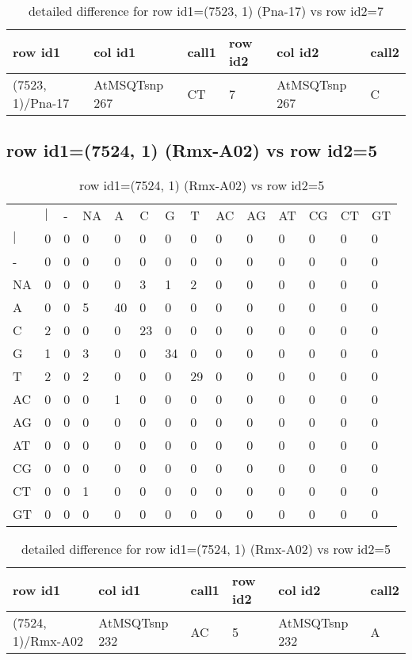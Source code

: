 \begin{center}
\begin{longtable}{|l|l|l|l|l|l|}
\caption{detailed difference for row id1=(7523, 1) (Pna-17) vs row id2=7} \label{table_dm337}\\
\hline
row id1&col id1&call1&row id2&col id2&call2\\
\hline
(7523, 1)/Pna-17&AtMSQTsnp 267&CT&7&AtMSQTsnp 267&C\\
\hline
\end{longtable}
\end{center}

\subsection{row id1=(7524, 1) (Rmx-A02) vs row id2=5}
\begin{center}
\begin{longtable}{|l|l|l|l|l|l|l|l|l|l|l|l|l|l|}
\caption{row id1=(7524, 1) (Rmx-A02) vs row id2=5} \label{table_dm338}\\
\hline
\\
\hline
&$|$&-&NA&A&C&G&T&AC&AG&AT&CG&CT&GT\\
$|$&0&0&0&0&0&0&0&0&0&0&0&0&0\\
-&0&0&0&0&0&0&0&0&0&0&0&0&0\\
NA&0&0&0&0&3&1&2&0&0&0&0&0&0\\
A&0&0&5&40&0&0&0&0&0&0&0&0&0\\
C&2&0&0&0&23&0&0&0&0&0&0&0&0\\
G&1&0&3&0&0&34&0&0&0&0&0&0&0\\
T&2&0&2&0&0&0&29&0&0&0&0&0&0\\
AC&0&0&0&1&0&0&0&0&0&0&0&0&0\\
AG&0&0&0&0&0&0&0&0&0&0&0&0&0\\
AT&0&0&0&0&0&0&0&0&0&0&0&0&0\\
CG&0&0&0&0&0&0&0&0&0&0&0&0&0\\
CT&0&0&1&0&0&0&0&0&0&0&0&0&0\\
GT&0&0&0&0&0&0&0&0&0&0&0&0&0\\
\hline
\end{longtable}
\end{center}

\begin{center}
\begin{longtable}{|l|l|l|l|l|l|}
\caption{detailed difference for row id1=(7524, 1) (Rmx-A02) vs row id2=5} \label{table_dm339}\\
\hline
row id1&col id1&call1&row id2&col id2&call2\\
\hline
(7524, 1)/Rmx-A02&AtMSQTsnp 232&AC&5&AtMSQTsnp 232&A\\
\hline
\end{longtable}
\end{center}

